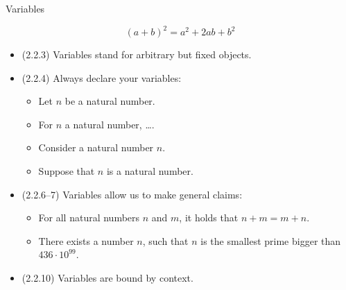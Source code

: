 \documentclass[../slides.tex]{subfiles}
\begin{document}
\begin{frame}{Variables}

	\[(a+b)^2=a^2+2ab+b^2\]
	
	\begin{itemize}
	
		\item (2.2.3) Variables stand for arbitrary but fixed objects.
		
		\item (2.2.4) Always declare your variables:
		
			\begin{itemize} 
			
				\item Let $n$ be a natural number. 
							
				\item For $n$ a natural number, \dots.
				
				\item Consider a natural number $n$.
				
				\item Suppose that $n$ is a natural number. 
			
			\end{itemize}
		
		\item (2.2.6--7) Variables allow us to make general claims:
		
			\begin{itemize}
			
				\item For all natural numbers $n$ and $m$, it holds that $n+m=m+n$.
				
				\item There exists a number $n$, such that $n$ is the smallest prime bigger than $436\cdot 10^99$.
			
			\end{itemize}
			
		\item (2.2.10) Variables are bound by context.
	
	\end{itemize}

\end{frame}
\end{document}

